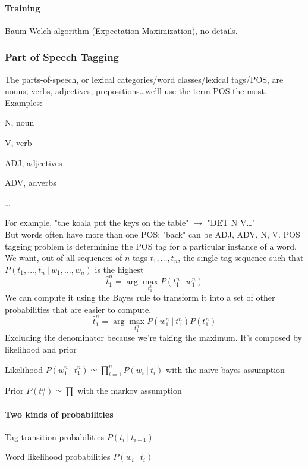 \documentclass[10pt]{report}
\begin{document}
\paragraph{Training} Baum-Welch algorithm (Expectation Maximization), no details.
\subsubsection{Part of Speech Tagging} The parts-of-speech, or lexical categories/word classes/lexical tags/POS, are nouns, verbs, adjectives, prepositions\ldots we'll use the term POS the most. Examples:
\begin{list}{}{}
	\item N, noun
	\item V, verb
	\item ADJ, adjectives
	\item ADV, adverbs
	\item \ldots
\end{list}
For example, "the koala put the keys on the table" $\rightarrow$ "DET N V\ldots"\\
But words often have more than one POS: "back" can be ADJ, ADV, N, V. POS tagging problem is determining the POS tag for a particular instance of a word.\\
We want, out of all sequences of $n$ tags $t_1,\ldots,t_n$, the single tag sequence such that $P(t_1,\ldots,t_n\:|\:w_1,\ldots,w_n)$ is the highest $$\hat{t}_1^n=\arg\max_{t_1^n} P(t_1^n\:|\: w_1^n)$$
We can compute it using the Bayes rule to transform it into a set of other probabilities that are easier to compute.
$$\hat{t}_1^n=\arg\max_{t_1^n} P(w_1^n \:|\: t_1^n)P(t_1^n)$$
Excluding the denominator because we're taking the maximum. It's composed by likelihood and prior\begin{list}{}{}
	\item Likelihood $P(w_1^n \:|\: t_1^n) \simeq \prod_{i=1}^n P(w_i\:|\:t_i)$ with the naive bayes assumption
	\item Prior $P(t_1^n)\simeq \prod$ with the markov assumption %
\end{list}
\paragraph{Two kinds of probabilities}
\begin{list}{}{}
	\item Tag transition probabilities $P(t_i\:|\:t_{i-1})$ %
	\item Word likelihood probabilities $P(w_i\:|\:t_i)$ %
\end{list}
\end{document}
